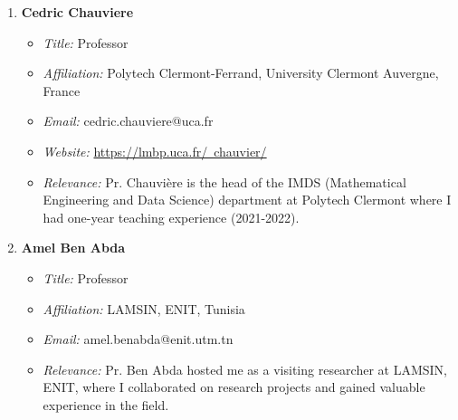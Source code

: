\documentclass[10pt]{article} %
\begin{document}
\begin{enumerate}
	\item \textbf{Cedric Chauviere}

\begin{itemize}
	\item \textit{Title:} Professor
	\item \textit{Affiliation:} Polytech Clermont-Ferrand, University Clermont Auvergne, France
	\item \textit{Email:} cedric.chauviere@uca.fr
	\item \textit{Website:} \href{https://lmbp.uca.fr/~chauvier/}{https://lmbp.uca.fr/~chauvier/}
	\item \textit{Relevance:} Pr. Chauvière is the head of the IMDS (Mathematical Engineering and Data Science) department at Polytech Clermont where I had one-year teaching experience (2021-2022).
\end{itemize}

	
	\item \textbf{Amel Ben Abda}
	
	\begin{itemize}
		\item \textit{Title:} Professor
		\item \textit{Affiliation:} LAMSIN, ENIT, Tunisia
		\item \textit{Email:} amel.benabda@enit.utm.tn
		\item \textit{Relevance:} Pr. Ben Abda hosted me as a visiting researcher at LAMSIN, ENIT, where I collaborated on research projects and gained valuable experience in the field.
	\end{itemize}
\end{enumerate}


\end{document}
